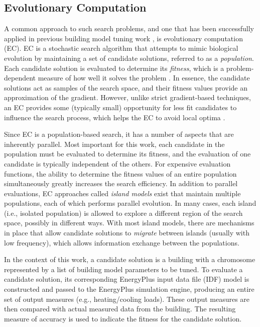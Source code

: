 \documentclass[preprint, review, 12pt]{elsarticle}
\begin{document}
\subsection{Evolutionary Computation}
A common approach to such search problems, and one that has been successfully applied in previous building model tuning work \cite{cit:garrett2013}, is evolutionary computation (EC). EC \cite{cit:dejong1993,cit:spears1993,cit:fogel1994,cit:fogel2000} is a stochastic search algorithm that attempts to mimic biological evolution by maintaining a set of candidate solutions, referred to as a \emph{population}. Each candidate solution is evaluated to determine its \emph{fitness}, which is a problem-dependent measure of how well it solves the problem \cite{cit:dejong2006}. In essence, the candidate solutions act as samples of the search space, and their fitness values provide an approximation of the gradient. However, unlike strict gradient-based techniques, an EC provides some (typically small) opportunity for less fit candidates to influence the search process, which helps the EC to avoid local optima \cite{cit:michalewicz2004}. 

Since EC is a population-based search, it has a number of aspects that are inherently parallel. Most important for this work, each candidate in the population must be evaluated to determine its fitness, and the evaluation of one candidate is typically independent of the others. For expensive evaluation functions, the ability to determine the fitness values of an entire population simultaneously greatly increases the search efficiency. In addition to parallel evaluations, EC approaches called \emph{island models} \cite{cit:eiben2007} exist that maintain multiple populations, each of which performs parallel evolution. In many cases, each island (i.e., isolated population) is allowed to explore a different region of the search space, possibly in different ways. With most island models, there are mechanisms in place that allow candidate solutions to \emph{migrate} between islands (usually with low frequency), which allows information exchange between the populations.

In the context of this work, a candidate solution is a building with a chromosome represented by a list of building model parameters to be tuned. To evaluate a candidate solution, its corresponding EnergyPlus input data file (IDF) model is constructed and passed to the EnergyPlus simulation engine, producing an entire set of output measures (e.g., heating/cooling loads). These output measures are then compared with actual measured data from the building. The resulting measure of accuracy is used to indicate the fitness for the candidate solution. %
\end{document}
